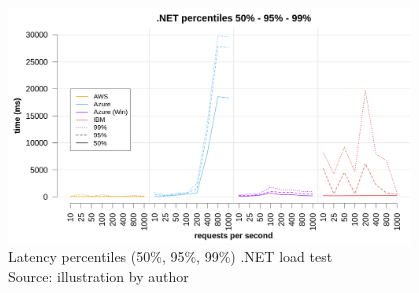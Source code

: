 \begin{figure}[b]
\begin{center}
\includegraphics[width=0.95\textwidth]{bilder/plot_percentile_latency_dotnet.png}
\captionsetup{justification=centering, labelfont=bf}
\caption[Latency percentiles (50\%, 95\%, 99\%) .NET load test]{Latency percentiles (50\%, 95\%, 99\%) .NET load test\\Source: illustration by author}
\label{fig:loadtest_percentile_dotnet}
\end{center}
\end{figure}

\newpage

